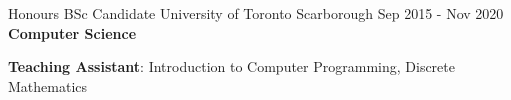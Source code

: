 
\begin{cventries}
  \cventry
    {Honours BSc Candidate}
    {University of Toronto}
    {Scarborough}
    {Sep 2015 - Nov 2020}
    {\textbf{Computer Science}}
    {
      \begin{cvitems}
        \item {\textbf{Teaching Assistant}: Introduction to Computer Programming, Discrete Mathematics}
      \end{cvitems}
    }
\end{cventries}
